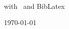\thispagestyle{empty}
\begin{center}
  \vspace*{200pt}
  {\HUGE\thetitle}\\
  \vspace{20pt}
  {\large with \engineLogo\ and BibLatex}\\
\end{center}
\vfill
{\Large\theauthor}\hfill{\Large\today}